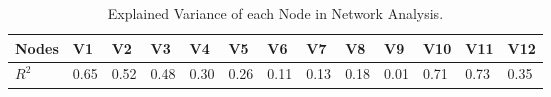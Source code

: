 \begin{table}[]
\centering
\begin{tabular}{lllllllllllll}
\hline
\textbf{Nodes}                & \textbf{V1} & \textbf{V2} & \textbf{V3} & \textbf{V4} & \textbf{V5} & \textbf{V6} & \textbf{V7} & \textbf{V8} & \textbf{V9} & \textbf{V10} & \textbf{V11} & \textbf{V12} \\ \hline
\textbf{$R^2$} & 0.65        & 0.52        & 0.48        & 0.30        & 0.26        & 0.11        & 0.13        & 0.18        & 0.01        & 0.71         & 0.73         & 0.35         \\ \hline
\end{tabular}
\caption[]{Explained Variance of each Node in Network Analysis.}
\label{tab:Rsqu}
\end{table}






